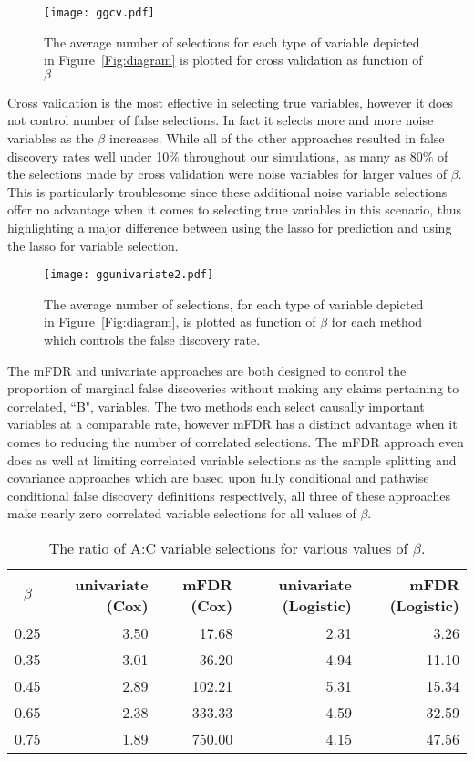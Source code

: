 \begin{figure} [!htb]
 \centering
  \texttt{[image: ggcv.pdf]}
  \caption{The average number of selections for each type of variable depicted in Figure~\ref{Fig:diagram} is plotted for cross validation as function of $\beta$ }
\end{figure}

Cross validation is the most effective in selecting true variables, however it does not control number of false selections. In fact it selects more and more noise variables as the $\beta$ increases. While all of the other approaches resulted in false discovery rates well under 10\% throughout our simulations, as many as $80\%$ of the selections made by cross validation were noise variables for larger values of $\beta$. This is particularly troublesome since these additional noise variable selections offer no advantage when it comes to selecting true variables in this scenario, thus highlighting a major difference between using the lasso for prediction and using the lasso for variable selection.

\begin{figure} [!htb]
 \centering
  \texttt{[image: ggunivariate2.pdf]}
  \caption{The average number of selections, for each type of variable depicted in Figure~\ref{Fig:diagram}, is plotted as function of $\beta$ for each method which controls the false discovery rate.}
\end{figure}

The mFDR and univariate approaches are both designed to control the proportion of marginal false discoveries without making any claims pertaining to correlated, ``B", variables. The two methods each select causally important variables at a comparable rate, however mFDR has a distinct advantage when it comes to reducing the number of correlated selections. The mFDR approach even does as well at limiting correlated variable selections as the sample splitting and covariance approaches which are based upon fully conditional and pathwise conditional false discovery definitions respectively, all three of these approaches make nearly zero correlated variable selections for all values of $\beta$. 

\begin{table}[ht]
\centering
\begin{tabular}{c | r r r r}
  \hline
 $\beta$ & univariate (Cox) & mFDR (Cox) & univariate (Logistic) & mFDR (Logistic) \\ 
  \hline
  0.25 & 3.50 & 17.68 & 2.31 & 3.26 \\ 
  0.35 & 3.01 & 36.20 & 4.94 & 11.10 \\ 
  0.45 & 2.89 & 102.21 & 5.31 & 15.34 \\ 
  0.65 & 2.38 & 333.33 & 4.59 & 32.59 \\ 
  0.75 & 1.89 & 750.00 & 4.15 & 47.56 \\ 
   \hline
\end{tabular}
\caption{The ratio of A:C variable selections for various values of $\beta$.}
\end{table}

